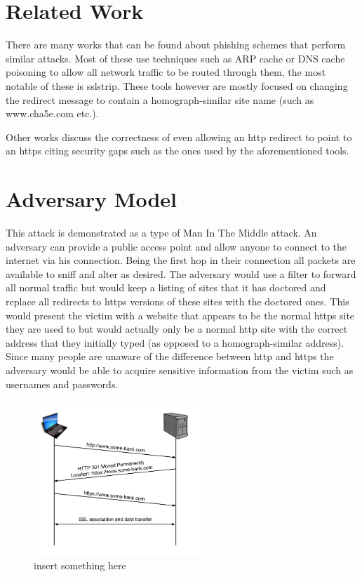 \documentclass{article}
\begin{document}
\section{Related Work}
There are many works that can be found about phishing schemes that perform similar attacks.  Most of these use techniques such as ARP cache or DNS cache poisoning to allow all network traffic to be routed through them, the most notable of these is sslstrip.  These tools however are mostly focused on changing the redirect message to contain a homograph-similar site name (such as www.cha5e.com etc.).

Other works discuss the correctness of even allowing an http redirect to point to an https citing security gaps such as the ones used by the aforementioned tools.

\section{Adversary Model}
This attack is demonstrated as a type of Man In The Middle attack.  An adversary can provide a public access point and allow anyone to connect to the internet via his connection.  Being the first hop in their connection all packets are available to sniff and alter as desired.  The adversary would use a filter to forward all normal traffic but would keep a listing of sites that it has doctored and replace all redirects to https versions of these sites with the doctored ones.  This would present the victim with a website that appears to be the normal https site they are used to but would actually only be a normal http site with the correct address that they initially typed (as opposed to a homograph-similar address).  Since many people are unaware of the difference between http and https the adversary would be able to acquire sensitive information from the victim such as usernames and passwords.

\begin{figure}[t]
\begin{center}

\includegraphics[width=2.5in]{normal_redirect.png} 
\caption{insert something here} 
\label{fg:redirect}

\end{center}
\end{figure}
\end{document}
